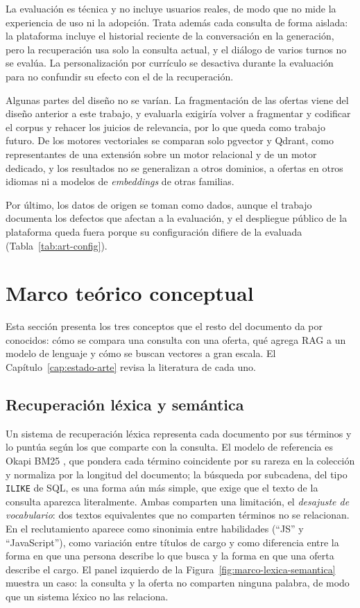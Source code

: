 La evaluación es técnica y no incluye usuarios reales, de modo que no mide la experiencia de uso ni la adopción. Trata además cada consulta de forma aislada: la plataforma incluye el historial reciente de la conversación en la generación, pero la recuperación usa solo la consulta actual, y el diálogo de varios turnos no se evalúa. La personalización por currículo se desactiva durante la evaluación para no confundir su efecto con el de la recuperación.

Algunas partes del diseño no se varían. La fragmentación de las ofertas viene del diseño anterior a este trabajo, y evaluarla exigiría volver a fragmentar y codificar el corpus y rehacer los juicios de relevancia, por lo que queda como trabajo futuro. De los motores vectoriales se comparan solo pgvector y Qdrant, como representantes de una extensión sobre un motor relacional y de un motor dedicado, y los resultados no se generalizan a otros dominios, a ofertas en otros idiomas ni a modelos de \textit{embeddings} de otras familias.

Por último, los datos de origen se toman como dados, aunque el trabajo documenta los defectos que afectan a la evaluación, y el despliegue público de la plataforma queda fuera porque su configuración difiere de la evaluada (Tabla~\ref{tab:art-config}).

\section{Marco teórico conceptual}
\label{sec:marco-teorico}

Esta sección presenta los tres conceptos que el resto del documento da por conocidos: cómo se compara una consulta con una oferta, qué agrega RAG a un modelo de lenguaje y cómo se buscan vectores a gran escala. El Capítulo~\ref{cap:estado-arte} revisa la literatura de cada uno.

\subsection{Recuperación léxica y semántica}
\label{sec:marco-lexica}

Un sistema de recuperación léxica representa cada documento por sus términos y lo puntúa según los que comparte con la consulta. El modelo de referencia es Okapi BM25 \citep{Robertson2009}, que pondera cada término coincidente por su rareza en la colección y normaliza por la longitud del documento; la búsqueda por subcadena, del tipo \texttt{ILIKE} de SQL, es una forma aún más simple, que exige que el texto de la consulta aparezca literalmente. Ambas comparten una limitación, el \emph{desajuste de vocabulario}: dos textos equivalentes que no comparten términos no se relacionan. En el reclutamiento aparece como sinonimia entre habilidades (\enquote{JS} y \enquote{JavaScript}), como variación entre títulos de cargo y como diferencia entre la forma en que una persona describe lo que busca y la forma en que una oferta describe el cargo. El panel izquierdo de la Figura~\ref{fig:marco-lexica-semantica} muestra un caso: la consulta y la oferta no comparten ninguna palabra, de modo que un sistema léxico no las relaciona.

